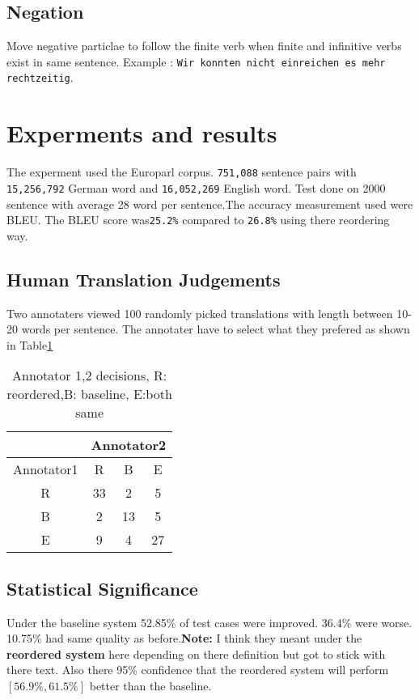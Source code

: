 \documentclass[10pt]{article}
\begin{document}
\begin{multicols*}{2}
\begin{flushleft}
\subsection{Negation}
Move negative particlae to follow the finite verb when finite and infinitive verbs exist in same sentence. Example : \texttt{Wir konnten {\color{red}nicht} einreichen es mehr rechtzeitig}.
\section{Experments and results}
The experment used the Europarl corpus. \texttt{751,088} sentence pairs with \texttt{15,256,792} German word and \texttt{16,052,269} English word. Test done on 2000 sentence with average 28 word per sentence.The accuracy measurement used were BLEU. The BLEU score was\texttt{25.2\%} compared to \texttt{26.8\%} using there reordering way.
\subsection{Human Translation Judgements}
Two annotaters viewed 100 randomly picked translations with length between 10-20 words per sentence. The annotater have to select what they prefered as shown in Table\ref{table1}
\vspace{-2ex}
\begin{table}[H]
\begin{center}
\begin{tabular}{|c||c|c|c|}
\hline
& \multicolumn{3}{c|}{Annotator2}\\
\hline
\hline
Annotator1&R&B&E\\
\hline
R&33&2&5\\
\hline
B&2&13&5\\
\hline
E&9&4&27\\
\hline
\end{tabular}
\end{center}
\vspace{-4ex}
\caption{Annotator 1,2 decisions, R: reordered,B: baseline, E:both same\label{table1}}
\end{table}
\subsection{Statistical Significance}
Under the baseline system 52.85\% of test cases were improved. 36.4\% were worse. 10.75\% had same quality as before.\textbf{Note:}{\color{red} I think they meant under the \textbf{reordered system} here depending on there definition but got to stick with there text}.
Also there 95\% confidence that the reordered system will perform \([56.9\%,61.5\%]\) better than the baseline.
\end{flushleft}

\end{multicols*}
\end{document}
